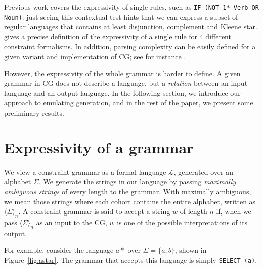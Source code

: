\documentclass[11pt]{article}
\def\t#1{\texttt{#1}}
\begin{document}
Previous work covers the expressivity of single rules, such as \texttt{IF (NOT 1* Verb OR Noun)}: just seeing this contextual test hints that we can express a subset of regular languages that contains at least disjunction, complement and Kleene star. 
 gives a precise definition of the expressivity of a single rule for 4 different constraint formalisms. In addition, parsing complexity can be easily defined for a given variant and implementation of CG; see for instance .

However, the expressivity of the whole grammar is harder to define. 
A given grammar in CG does not describe a language, but a \emph{relation} between an input language and an output language. 
In the following section, we introduce our approach to emulating generation, and in the rest of the paper, we present some preliminary results.

\section{Expressivity of a grammar}

We view a constraint grammar as a formal language $\mathcal{L}$, generated over an 
alphabet $\Sigma$. We generate the strings in our language by passing 
\emph{maximally ambiguous strings} of every length to the grammar. 
With maximally ambiguous, we mean those strings where each cohort contains the 
entire alphabet, written as $\langle \Sigma \rangle_n$. 
A constraint grammar is said to accept a string $w$ of length $n$ if, 
when we pass $\langle \Sigma \rangle_n$ as an input to the CG,
$w$ is one of the possible interpretations of its output.

For example, consider the language $a*$ over $\Sigma = \{a,b\}$,
shown in Figure~\ref{fig:astar}.
The grammar that accepts this language is simply \texttt{SELECT (a)}.

\def\wwf{~~~~\t{"<w>"}}
\def\alm{\t{"a" a}~~~~~~}
\def\blm{\t{"b" b}~~~~~~}
\end{document}

